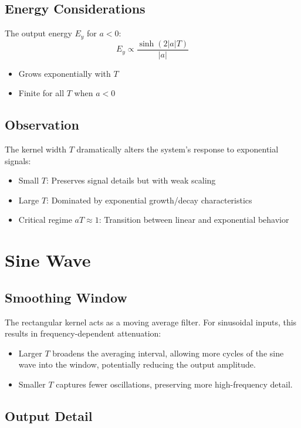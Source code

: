 \documentclass[12pt,a4paper]{report}
\begin{document}
\subsection{Energy Considerations}
The output energy \( E_y \) for \( a < 0 \):
\[
E_y \propto \frac{\sinh(2|a|T)}{|a|}
\]
\begin{itemize}
    \item Grows exponentially with \( T \)
    \item Finite for all \( T \) when \( a < 0 \)
\end{itemize}

\subsection{Observation}
The kernel width \( T \) dramatically alters the system’s response to exponential signals:
\begin{itemize}
    \item Small \( T \): Preserves signal details but with weak scaling
    \item Large \( T \): Dominated by exponential growth/decay characteristics
    \item Critical regime \( aT \approx 1 \): Transition between linear and exponential behavior
\end{itemize}
\section{Sine Wave}
\subsection{Smoothing Window}

The rectangular kernel acts as a moving average filter. For sinusoidal inputs, this results in frequency-dependent attenuation:

\begin{itemize}
    \item Larger \( T \) broadens the averaging interval, allowing more cycles of the sine wave into the window, potentially reducing the output amplitude.
    \item Smaller \( T \) captures fewer oscillations, preserving more high-frequency detail.
\end{itemize}
\subsection{Output Detail}
\end{document}

